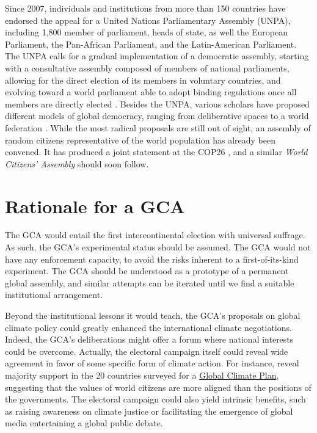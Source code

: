 \documentclass[12pt,english]{article}
\begin{document}
Since 2007, individuals and institutions from more than 150 countries have endorsed the appeal for a United Nations Parliamentary Assembly (UNPA), including 1,800 member of parliament, heads of state, as well the European Parliament, the Pan-African Parliament, and the Latin-American Parliament. The UNPA calls for a gradual implementation of a democratic assembly, starting with a consultative assembly composed of members of national parliaments, allowing for the direct election of its members in voluntary countries, and evolving toward a world parliament able to adopt binding regulations once all members are directly elected \citep{leinen_world_2018}. %
Besides the UNPA, various scholars have proposed different models of global democracy, ranging from deliberative spaces to a world federation \citep{archibugi_global_2011}. %
While the most radical proposals are still out of sight, an assembly of random citizens representative of the world population has already been convened. It has produced a joint statement at the COP26 \citep{global_assembly_report_2022}, and a similar \textit{World Citizens' Assembly} should soon follow. 

\section{Rationale for a GCA}

The GCA would entail the first intercontinental election with universal suffrage. As such, the GCA's experimental status should be assumed. The GCA would not have any enforcement capacity, to avoid the risks inherent to a first-of-its-kind experiment. 
The GCA should be understood as a prototype of a permanent global assembly, and similar attempts can be iterated until we find a suitable institutional arrangement. 

Beyond the institutional lessons it would teach, the GCA's proposals on global climate policy could greatly enhanced the international climate negotiations. Indeed, the GCA's deliberations might offer a forum where national interests could be overcome. Actually, the electoral campaign itself could reveal wide agreement in favor of some specific form of climate action. For instance, \citet{fabre_international_2023} reveal majority support in the 20 countries surveyed for a \href{https://github.com/bixiou/global_tax_attitudes/raw/main/paper/policy_brief_GCS.pdf}{Global Climate Plan}, suggesting that the values of world citizens are more aligned than the positions of the governments. The electoral campaign could also yield intrinsic benefits, such as raising awareness on climate justice or facilitating the emergence of global media entertaining a global public debate. 
\end{document}
